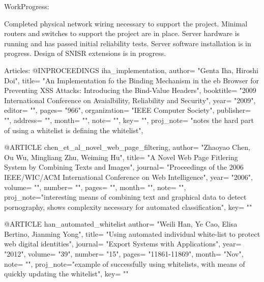 WorkProgress:

Completed physical network wiring necessary to support the project.
Minimal routers and switches to support the project are in place.
Server hardware is running and has passed initial reliability tests.
Server software installation is in progress.
Design of SNISR extensions is in progress.


Articles:
@INPROCEEDINGS { iha_implementation,
   author= "Genta Iha, Hiroshi Doi",
   title= "An Implementation fo the Binding Mechanism in the eb Browser for
Preventing XSS Attacks: Introducing the Bind-Value Headers",
   booktitle= "2009 International Conference on Avaialbility, Reliability
and Security",
   year= "2009",
   editor= "",
   pages= "966",
   organization= "IEEE Computer Society",
   publisher= "",
   address= "",
   month= "",
   note= "",
   key= "",
   proj_note= "notes the hard part of using a whitelist is defining the
whitelist", }

@ARTICLE { chen_et_al_novel_web_page_filtering, 
   author= "Zhaoyao Chen, Ou Wu, Mingliang Zhu, Weiming Hu",
   title= "A Novel Web Page Fitlering System by Combining Texts and Images",
   journal= "Proceedings of the 2006 IEEE/WIC/ACM International Conference
on Web Intelligence",
   year= "2006",
   volume= "",
   number= "",
   pages= "",
   month= "",
   note= "",
   proj_note="interesting means of combining text and graphical data to
detect pornography, shows complexity necessary for automated classification",
   key= "" }

@ARTICLE { han_automated_whitelist
   author= "Weili Han, Ye Cao, Elisa Bertino, Jianming Yong",
   title= "Using automated individual white-list to protect web digital
identities",
   journal= "Export Systems with Applications",
   year= "2012",
   volume= "39",
   number= "15",
   pages= "11861-11869",
   month= "Nov",
   note= "",
   proj_note="example of successfully using whitelists, with means of
quickly updating the whitelist",
   key= "" }


